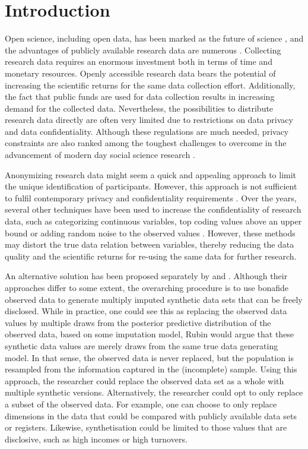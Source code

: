 \documentclass[psych,article,submit,moreauthors,pdftex]{mdpi}
\begin{document}

\hypertarget{introduction}{%
\section{Introduction}\label{introduction}}

Open science, including open data, has been marked as the future of
science \citep{gewin_data_2016}, and the advantages of publicly
available research data are numerous
\citep{molloy_open_2011, walport_brest_sharing_2011}. Collecting
research data requires an enormous investment both in terms of time and
monetary resources. Openly accessible research data bears the potential
of increasing the scientific returns for the same data collection
effort. Additionally, the fact that public funds are used for data
collection results in increasing demand for the collected data.
Nevertheless, the possibilities to distribute research data directly are
often very limited due to restrictions on data privacy and data
confidentiality. Although these regulations are much needed, privacy
constraints are also ranked among the toughest challenges to overcome in
the advancement of modern day social science research
\citep{lazer_life_2009}.

Anonymizing research data might seem a quick and appealing approach to
limit the unique identification of participants. However, this approach
is not sufficient to fulfil contemporary privacy and confidentiality
requirements \citep{ohm_broken_2009, national_putting_2007}. Over the
years, several other techniques have been used to increase the
confidentiality of research data, such as categorizing continuous
variables, top coding values above an upper bound or adding random noise
to the observed values \citep{drechsler_synthetic_2011}. However, these
methods may distort the true data relation between variables, thereby
reducing the data quality and the scientific returns for re-using the
same data for further research.

An alternative solution has been proposed separately by
\citet{rubin_statistical_disclosure_1993} and
\citet{little_statistical_1993}. Although their approaches differ to
some extent, the overarching procedure is to use bonafide observed data
to generate multiply imputed synthetic data sets that can be freely
disclosed. While in practice, one could see this as replacing the
observed data values by multiple draws from the posterior predictive
distribution of the observed data, based on some imputation model, Rubin
would argue that these synthetic data values are merely draws from the
same true data generating model. In that sense, the observed data is
never replaced, but the population is resampled from the information
captured in the (incomplete) sample. Using this approach, the researcher
could replace the observed data set as a whole with multiple synthetic
versions. Alternatively, the researcher could opt to only replace a
subset of the observed data. For example, one can choose to only replace
dimensions in the data that could be compared with publicly available
data sets or registers. Likewise, synthetisation could be limited to
those values that are disclosive, such as high incomes or high
turnovers.
\end{document}
